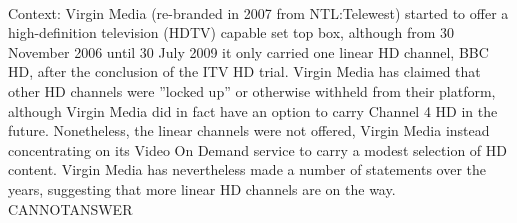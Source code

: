 \documentclass[11pt,a4paper, onecolumn]{article}
\begin{document}
\\ Context: Virgin Media (re-branded in 2007 from NTL:Telewest) started to offer a high-definition television (HDTV) capable set top box, although from 30 November 2006 until 30 July 2009 it only carried one linear HD channel, BBC HD, after the conclusion of the ITV HD trial. Virgin Media has claimed that other HD channels were ''locked up'' or otherwise withheld from their platform, although Virgin Media did in fact have an option to carry Channel 4 HD in the future. Nonetheless, the linear channels were not offered, Virgin Media instead concentrating on its Video On Demand service to carry a modest selection of HD content. Virgin Media has nevertheless made a number of statements over the years, suggesting that more linear HD channels are on the way. CANNOTANSWER
\end{document}
